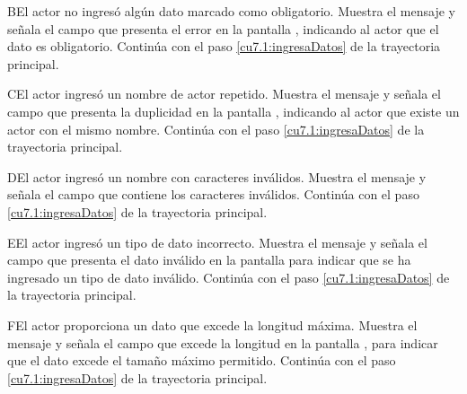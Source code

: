  \begin{UCtrayectoriaA}{B}{El actor no ingresó algún dato marcado como obligatorio.}
    \UCpaso[\UCsist] Muestra el mensaje  y señala el campo que presenta el error en la pantalla 
	    , indicando al actor que el dato es obligatorio.
    \UCpaso[] Continúa con el paso \ref{cu7.1:ingresaDatos} de la trayectoria principal.
 \end{UCtrayectoriaA}
 \begin{UCtrayectoriaA}{C}{El actor ingresó un nombre de actor repetido.}
    \UCpaso[\UCsist] Muestra el mensaje  y señala el campo que presenta la duplicidad en la pantalla 
	    , indicando al actor que existe un actor con el mismo nombre.
    \UCpaso[] Continúa con el paso \ref{cu7.1:ingresaDatos} de la trayectoria principal.
 \end{UCtrayectoriaA}
 \begin{UCtrayectoriaA}{D}{El actor ingresó un nombre con caracteres inválidos.}
    \UCpaso[\UCsist] Muestra el mensaje  y señala el campo que contiene los caracteres inválidos.
    \UCpaso[] Continúa con el paso \ref{cu7.1:ingresaDatos} de la trayectoria principal.
 \end{UCtrayectoriaA}
 \begin{UCtrayectoriaA}{E}{El actor ingresó un tipo de dato incorrecto.}
    \UCpaso[\UCsist] Muestra el mensaje  y señala el campo que presenta el dato inválido en la 
    pantalla  para indicar que se ha ingresado un tipo de dato inválido.
    \UCpaso[] Continúa con el paso \ref{cu7.1:ingresaDatos} de la trayectoria principal.
 \end{UCtrayectoriaA}
 \begin{UCtrayectoriaA}{F}{El actor proporciona un dato que excede la longitud máxima.}
    \UCpaso[\UCsist] Muestra el mensaje  y señala el campo que excede la 
    longitud en la pantalla , para indicar que el dato excede el tamaño máximo permitido.
    \UCpaso[] Continúa con el paso \ref{cu7.1:ingresaDatos} de la trayectoria principal.
 \end{UCtrayectoriaA}
 
